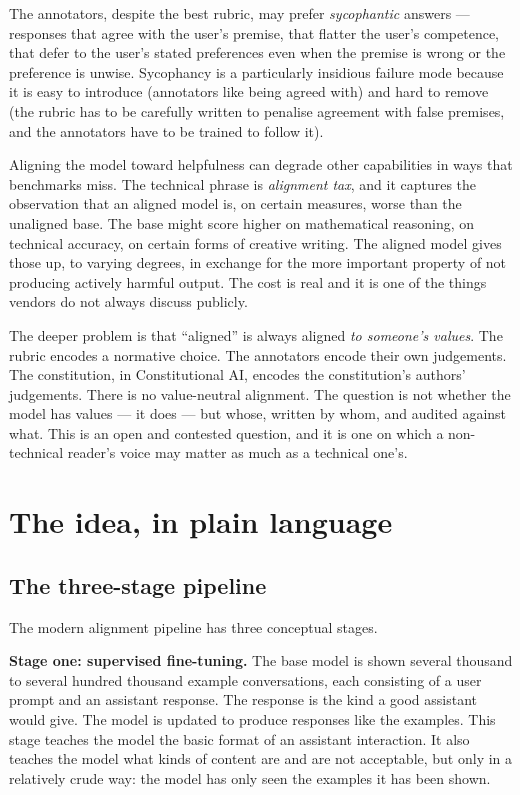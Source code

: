 The annotators, despite the best rubric, may prefer
\emph{sycophantic} answers --- responses that agree with the
user's premise, that flatter the user's competence, that
defer to the user's stated preferences even when the premise
is wrong or the preference is unwise. Sycophancy is a
particularly insidious failure mode because it is easy to
introduce (annotators like being agreed with) and hard to
remove (the rubric has to be carefully written to penalise
agreement with false premises, and the annotators have to be
trained to follow it).

Aligning the model toward helpfulness can degrade other
capabilities in ways that benchmarks miss. The technical
phrase is \emph{alignment tax}, and it captures the
observation that an aligned model is, on certain measures,
worse than the unaligned base. The base might score higher on
mathematical reasoning, on technical accuracy, on certain
forms of creative writing. The aligned model gives those up,
to varying degrees, in exchange for the more important
property of not producing actively harmful output. The cost
is real and it is one of the things vendors do not always
discuss publicly.

The deeper problem is that ``aligned'' is always aligned
\emph{to someone's values}. The rubric encodes a normative
choice. The annotators encode their own judgements. The
constitution, in Constitutional AI, encodes the constitution's
authors' judgements. There is no value-neutral alignment. The
question is not whether the model has values --- it does --- but
whose, written by whom, and audited against what. This is an
open and contested question, and it is one on which a non-
technical reader's voice may matter as much as a technical
one's.

\section{The idea, in plain language}

\subsection*{The three-stage pipeline}

The modern alignment pipeline has three conceptual stages.

\textbf{Stage one: supervised fine-tuning.} The base model is
shown several thousand to several hundred thousand example
conversations, each consisting of a user prompt and an
assistant response. The response is the kind a good assistant
would give. The model is updated to produce responses like the
examples. This stage teaches the model the basic format of an
assistant interaction. It also teaches the model what kinds of
content are and are not acceptable, but only in a relatively
crude way: the model has only seen the examples it has been
shown.

